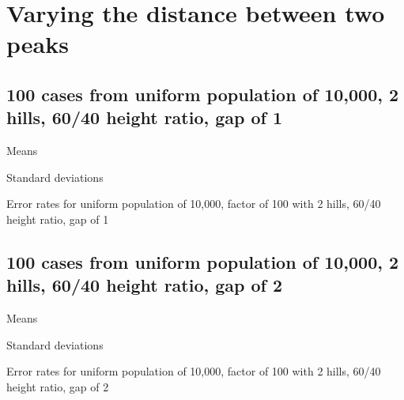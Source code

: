 \section{Varying the distance between two peaks}

\subsection{100 cases from uniform population of 10,000, 2 hills, 60/40 height ratio, gap of 1}
\begin{table}[H]
\centering
\scriptsize

    \begin{subtable}{0.5\textwidth}
    
    \caption{Means} 
    \end{subtable}%
    \begin{subtable}{0.5\textwidth}
    
    \caption{Standard deviations} 
    \end{subtable}

\caption{Error rates for uniform population of 10,000, factor of 100 with 2 hills, 60/40 height ratio, gap of 1}
\label{tbl:mean_error_rates:unif_100_1_2h_1}
\end{table}

\subsection{100 cases from uniform population of 10,000, 2 hills, 60/40 height ratio, gap of 2}
\begin{table}[H]
\centering
\scriptsize

    \begin{subtable}{0.5\textwidth}
    
    \caption{Means} 
    \end{subtable}%
    \begin{subtable}{0.5\textwidth}
    
    \caption{Standard deviations} 
    \end{subtable}

\caption{Error rates for uniform population of 10,000, factor of 100 with 2 hills, 60/40 height ratio, gap of 2}
\label{tbl:mean_error_rates:unif_100_1_2h_2}
\end{table}

